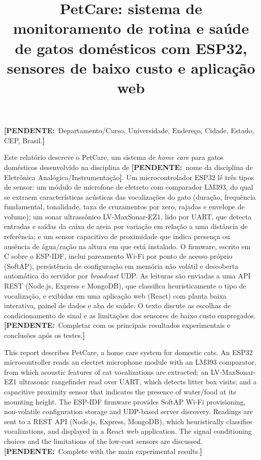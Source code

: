 \documentclass[portuguese]{sbcreviews-2025}%
\title[PetCare: monitoramento de gatos com ESP32]{PetCare: sistema de monitoramento de rotina e saúde de gatos domésticos com ESP32, sensores de baixo custo e aplicação web}
\author[\pendente{Sobrenome} et al. 2026]{
\affil{\textbf{\pendente{Autor 1}}~\orcidlink{0000-0000-0000-0000}~\textcolor{blue}{\faEnvelope}~~[{\pendente{Instituição}}~|\href{mailto:autor1@exemplo.br}{~{\textit{\pendente{e-mail}}}}~]}

\affil{\textbf{\pendente{Autor 2}}~\orcidlink{0000-0000-0000-0000}~[{\pendente{Instituição}}~|\href{mailto:autor2@exemplo.br}{~{\textit{\pendente{e-mail}}}}~]}

\affil{\textbf{\pendente{Autor 3}}~\orcidlink{0000-0000-0000-0000}~[{\pendente{Instituição}}~|\href{mailto:autor3@exemplo.br}{~{\textit{\pendente{e-mail}}}}~]}
}
\newcommand{\pendente}[1]{{\color{pendcolor}\textbf{[PENDENTE:}~#1\textbf{]}}}
\begin{document}
\begin{frontmatter}

\maketitle

\begin{mail}
\pendente{Departamento/Curso, Universidade, Endereço, Cidade, Estado, CEP, Brasil.}
\end{mail}

\begin{abstract-pt}
Este relatório descreve o PetCare, um sistema de \textit{home care} para gatos domésticos desenvolvido na disciplina de \pendente{nome da disciplina de Eletrônica Analógica/Instrumentação}. Um microcontrolador ESP32 lê três tipos de sensor: um módulo de microfone de eletreto com comparador LM393, do qual se extraem características acústicas das vocalizações do gato (duração, frequência fundamental, tonalidade, taxa de cruzamentos por zero, rajadas e envelope de volume); um sonar ultrassônico LV-MaxSonar-EZ1, lido por UART, que detecta entradas e saídas da caixa de areia por variação em relação a uma distância de referência; e um sensor capacitivo de proximidade que indica presença ou ausência de água/ração na altura em que está instalado. O firmware, escrito em C sobre o ESP-IDF, inclui pareamento Wi-Fi por ponto de acesso próprio (SoftAP), persistência de configuração em memória não volátil e descoberta automática do servidor por \textit{broadcast} UDP. As leituras são enviadas a uma API REST (Node.js, Express e MongoDB), que classifica heuristicamente o tipo de vocalização, e exibidas em uma aplicação web (React) com planta baixa interativa, painel de dados e aba de saúde. O texto discute as escolhas de condicionamento de sinal e as limitações dos sensores de baixo custo empregados. \pendente{Completar com os principais resultados experimentais e conclusões após os testes.}
\end{abstract-pt}

\begin{abstract-en}
This report describes PetCare, a home care system for domestic cats. An ESP32 microcontroller reads an electret microphone module with an LM393 comparator, from which acoustic features of cat vocalizations are extracted; an LV-MaxSonar-EZ1 ultrasonic rangefinder read over UART, which detects litter box visits; and a capacitive proximity sensor that indicates the presence of water/food at its mounting height. The ESP-IDF firmware provides SoftAP Wi-Fi provisioning, non-volatile configuration storage and UDP-based server discovery. Readings are sent to a REST API (Node.js, Express, MongoDB), which heuristically classifies vocalizations, and displayed in a React web application. The signal conditioning choices and the limitations of the low-cost sensors are discussed. \pendente{Complete with the main experimental results.}
\end{abstract-en}


\end{frontmatter}
\end{document}
